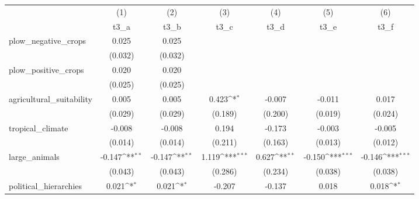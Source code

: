 {
\def\sym#1{\ifmmode^{#1}\else\(^{#1}\)\fi}
\begin{tabular}{l*{6}{c}}
\hline\hline
            &\multicolumn{1}{c}{(1)}&\multicolumn{1}{c}{(2)}&\multicolumn{1}{c}{(3)}&\multicolumn{1}{c}{(4)}&\multicolumn{1}{c}{(5)}&\multicolumn{1}{c}{(6)}\\
            &\multicolumn{1}{c}{t3\_a}&\multicolumn{1}{c}{t3\_b}&\multicolumn{1}{c}{t3\_c}&\multicolumn{1}{c}{t3\_d}&\multicolumn{1}{c}{t3\_e}&\multicolumn{1}{c}{t3\_f}\\
\hline
plow\_negative\_crops&       0.025         &       0.025         &                     &                     &                     &                     \\
            &     (0.032)         &     (0.032)         &                     &                     &                     &                     \\
[1em]
plow\_positive\_crops&       0.020         &       0.020         &                     &                     &                     &                     \\
            &     (0.025)         &     (0.025)         &                     &                     &                     &                     \\
[1em]
agricultural\_suitability&       0.005         &       0.005         &       0.423\sym{*}  &      -0.007         &      -0.011         &       0.017         \\
            &     (0.029)         &     (0.029)         &     (0.189)         &     (0.200)         &     (0.019)         &     (0.024)         \\
[1em]
tropical\_climate&      -0.008         &      -0.008         &       0.194         &      -0.173         &      -0.003         &      -0.005         \\
            &     (0.014)         &     (0.014)         &     (0.211)         &     (0.163)         &     (0.013)         &     (0.012)         \\
[1em]
large\_animals&      -0.147\sym{**} &      -0.147\sym{**} &       1.119\sym{***}&       0.627\sym{**} &      -0.150\sym{***}&      -0.146\sym{***}\\
            &     (0.043)         &     (0.043)         &     (0.286)         &     (0.234)         &     (0.038)         &     (0.038)         \\
[1em]
political\_hierarchies&       0.021\sym{*}  &       0.021\sym{*}  &      -0.207         &      -0.137         &       0.018         &       0.018\sym{*}  \\

\end{tabular}}
